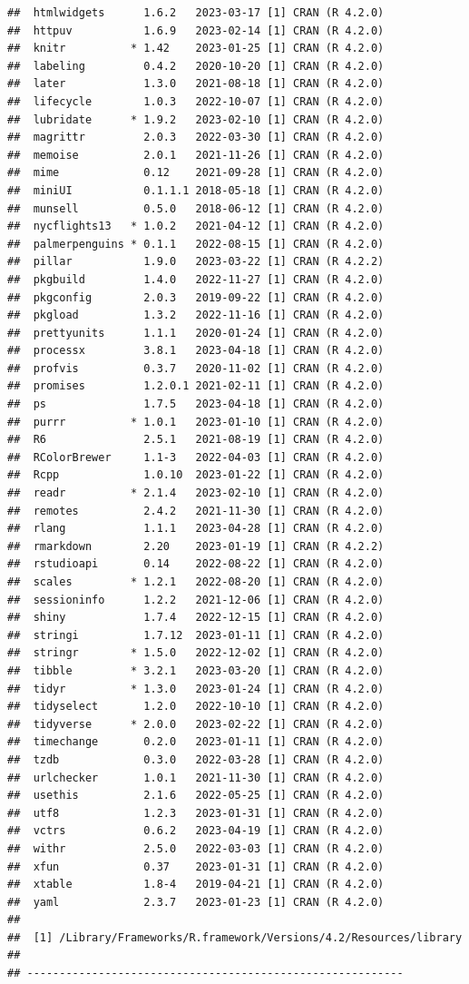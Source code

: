 \documentclass[print]{nuthesis}
\begin{document}
\begin{verbatim}
##  htmlwidgets      1.6.2   2023-03-17 [1] CRAN (R 4.2.0)
##  httpuv           1.6.9   2023-02-14 [1] CRAN (R 4.2.0)
##  knitr          * 1.42    2023-01-25 [1] CRAN (R 4.2.0)
##  labeling         0.4.2   2020-10-20 [1] CRAN (R 4.2.0)
##  later            1.3.0   2021-08-18 [1] CRAN (R 4.2.0)
##  lifecycle        1.0.3   2022-10-07 [1] CRAN (R 4.2.0)
##  lubridate      * 1.9.2   2023-02-10 [1] CRAN (R 4.2.0)
##  magrittr         2.0.3   2022-03-30 [1] CRAN (R 4.2.0)
##  memoise          2.0.1   2021-11-26 [1] CRAN (R 4.2.0)
##  mime             0.12    2021-09-28 [1] CRAN (R 4.2.0)
##  miniUI           0.1.1.1 2018-05-18 [1] CRAN (R 4.2.0)
##  munsell          0.5.0   2018-06-12 [1] CRAN (R 4.2.0)
##  nycflights13   * 1.0.2   2021-04-12 [1] CRAN (R 4.2.0)
##  palmerpenguins * 0.1.1   2022-08-15 [1] CRAN (R 4.2.0)
##  pillar           1.9.0   2023-03-22 [1] CRAN (R 4.2.2)
##  pkgbuild         1.4.0   2022-11-27 [1] CRAN (R 4.2.0)
##  pkgconfig        2.0.3   2019-09-22 [1] CRAN (R 4.2.0)
##  pkgload          1.3.2   2022-11-16 [1] CRAN (R 4.2.0)
##  prettyunits      1.1.1   2020-01-24 [1] CRAN (R 4.2.0)
##  processx         3.8.1   2023-04-18 [1] CRAN (R 4.2.0)
##  profvis          0.3.7   2020-11-02 [1] CRAN (R 4.2.0)
##  promises         1.2.0.1 2021-02-11 [1] CRAN (R 4.2.0)
##  ps               1.7.5   2023-04-18 [1] CRAN (R 4.2.0)
##  purrr          * 1.0.1   2023-01-10 [1] CRAN (R 4.2.0)
##  R6               2.5.1   2021-08-19 [1] CRAN (R 4.2.0)
##  RColorBrewer     1.1-3   2022-04-03 [1] CRAN (R 4.2.0)
##  Rcpp             1.0.10  2023-01-22 [1] CRAN (R 4.2.0)
##  readr          * 2.1.4   2023-02-10 [1] CRAN (R 4.2.0)
##  remotes          2.4.2   2021-11-30 [1] CRAN (R 4.2.0)
##  rlang            1.1.1   2023-04-28 [1] CRAN (R 4.2.0)
##  rmarkdown        2.20    2023-01-19 [1] CRAN (R 4.2.2)
##  rstudioapi       0.14    2022-08-22 [1] CRAN (R 4.2.0)
##  scales         * 1.2.1   2022-08-20 [1] CRAN (R 4.2.0)
##  sessioninfo      1.2.2   2021-12-06 [1] CRAN (R 4.2.0)
##  shiny            1.7.4   2022-12-15 [1] CRAN (R 4.2.0)
##  stringi          1.7.12  2023-01-11 [1] CRAN (R 4.2.0)
##  stringr        * 1.5.0   2022-12-02 [1] CRAN (R 4.2.0)
##  tibble         * 3.2.1   2023-03-20 [1] CRAN (R 4.2.0)
##  tidyr          * 1.3.0   2023-01-24 [1] CRAN (R 4.2.0)
##  tidyselect       1.2.0   2022-10-10 [1] CRAN (R 4.2.0)
##  tidyverse      * 2.0.0   2023-02-22 [1] CRAN (R 4.2.0)
##  timechange       0.2.0   2023-01-11 [1] CRAN (R 4.2.0)
##  tzdb             0.3.0   2022-03-28 [1] CRAN (R 4.2.0)
##  urlchecker       1.0.1   2021-11-30 [1] CRAN (R 4.2.0)
##  usethis          2.1.6   2022-05-25 [1] CRAN (R 4.2.0)
##  utf8             1.2.3   2023-01-31 [1] CRAN (R 4.2.0)
##  vctrs            0.6.2   2023-04-19 [1] CRAN (R 4.2.0)
##  withr            2.5.0   2022-03-03 [1] CRAN (R 4.2.0)
##  xfun             0.37    2023-01-31 [1] CRAN (R 4.2.0)
##  xtable           1.8-4   2019-04-21 [1] CRAN (R 4.2.0)
##  yaml             2.3.7   2023-01-23 [1] CRAN (R 4.2.0)
## 
##  [1] /Library/Frameworks/R.framework/Versions/4.2/Resources/library
## 
## ----------------------------------------------------------
\end{verbatim}
\end{document}
